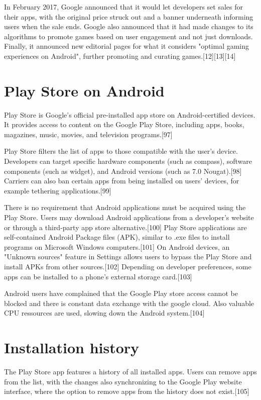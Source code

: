 \documentclass{article}                    %
\begin{document}
In February 2017, Google announced that it would let developers set sales for their apps, with the original price struck out and a banner underneath informing users when the sale ends. Google also announced that it had made changes to its algorithms to promote games based on user engagement and not just downloads. Finally, it announced new editorial pages for what it considers "optimal gaming experiences on Android", further promoting and curating games.[12][13][14]
\section{ Play Store on Android}    
Play Store is Google's official pre-installed app store on Android-certified devices. It provides access to content on the Google Play Store, including apps, books, magazines, music, movies, and television programs.[97]

Play Store filters the list of apps to those compatible with the user's device. Developers can target specific hardware components (such as compass), software components (such as widget), and Android versions (such as 7.0 Nougat).[98] Carriers can also ban certain apps from being installed on users' devices, for example tethering applications.[99]

There is no requirement that Android applications must be acquired using the Play Store. Users may download Android applications from a developer's website or through a third-party app store alternative.[100] Play Store applications are self-contained Android Package files (APK), similar to .exe files to install programs on Microsoft Windows computers.[101] On Android devices, an "Unknown sources" feature in Settings allows users to bypass the Play Store and install APKs from other sources.[102] Depending on developer preferences, some apps can be installed to a phone's external storage card.[103]

Android users have complained that the Google Play store access cannot be blocked and there is constant data exchange with the google cloud. Also valuable CPU ressources are used, slowing down the Android system.[104]
\section{ Installation history}    
The Play Store app features a history of all installed apps. Users can remove apps from the list, with the changes also synchronizing to the Google Play website interface, where the option to remove apps from the history does not exist.[105]
\end{document}
